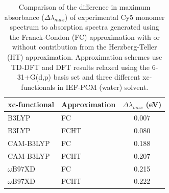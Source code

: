 \begin{table}[h]
\centering
\caption{Comparison of the difference in maximum absorbance ($\Delta\lambda_{max}$) of experimental Cy5 monomer spectrum \cite{Cannon2017} to absorption spectra generated using the Franck-Condon (FC) approximation with or without contribution from the Herzberg-Teller (HT) approximation. Approximation schemes use TD-DFT and DFT results relaxed using the 6-31+G(d,p) basis set and three different xc-functionals in IEF-PCM (water) solvent.} \label{tab:max-abs}
\begin{tabular}{llc}
\hline
xc-functional & Approximation & $\Delta\lambda_{max}$ (eV) \\ \hline
B3LYP & FC & 0.007 \\ 
B3LYP & FCHT & 0.080 \\ 
CAM-B3LYP & FC & 0.188 \\ 
CAM-B3LYP & FCHT & 0.207 \\ 
$\omega$B97XD & FC & 0.215 \\
$\omega$B97XD & FCHT & 0.222 \\ 
\end{tabular}
\end{table}

